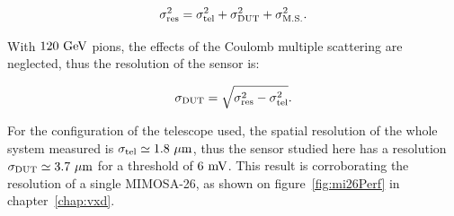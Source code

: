       \begin{equation}
        \sigma_{\rm{res}}^2 = \sigma_{\rm{tel}}^2 + \sigma_{\rm{DUT}}^2 + \sigma_{\rm{M.S.}}^2.
        \label{eq:pointingResolution}
      \end{equation}

      With $120~\rm{GeV}$ pions, the effects of the Coulomb multiple scattering are neglected, thus the resolution of the sensor is:

      \begin{equation}
        \sigma_{\rm{DUT}} = \sqrt{\sigma_{\rm{res}}^2 - \sigma_{\rm{tel}}^2}.
      \end{equation}

      For the configuration of the telescope used, the spatial resolution of the whole system measured is $\sigma_{\rm{tel}} \simeq 1.8~\rm{\mu m}$, thus the sensor studied here has a resolution $\sigma_{\rm{DUT}} \simeq 3.7~\rm{\mu m}$ for a threshold of $6~\rm{mV}$.
      This result is corroborating the resolution of a single MIMOSA-26, as shown on figure~\ref{fig:mi26Perf} in chapter~\ref{chap:vxd}.


